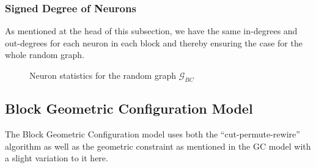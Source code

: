 \subsubsection{Signed Degree of Neurons}
As mentioned at the head of this subsection, we have the same in-degrees and out-degrees for each neuron in each block and thereby ensuring the case for the whole random graph. \begin{figure}[H]%
    \centering
    \captionsetup{justification=centering}
    \qquad
    \caption{Neuron statistics for the random graph $\mathcal{G}_{BC}$}%
    \label{fig:example}%
\end{figure}

\newpage

\subsection{Block Geometric Configuration Model}
The Block Geometric Configuration model uses both the ``cut-permute-rewire'' \cite{WattsStrogatz1998} algorithm as well as the geometric constraint as mentioned in the GC model with a slight variation to it here. 
